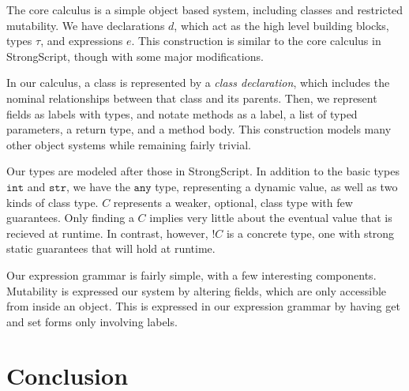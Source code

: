 \documentclass{llncs}
\newcommand{\strt}{\texttt{str}}
\newcommand{\intt}{\texttt{int}}
\newcommand{\anyt}{\texttt{any}}
\begin{document}
The core calculus is a simple object based system, including classes and 
restricted mutability. We have declarations $d$, which act as the high level 
building blocks, types $\tau$, and expressions $e$. This construction is 
similar to the core calculus in StrongScript, though with some major 
modifications.

In our calculus, a class is represented by a \emph{class declaration}, which 
includes the nominal relationships between that class and its parents. Then, we 
represent fields as labels with types, and notate methods as a label, a list 
of typed parameters, a return type, and a method body. This construction models 
many other object systems while remaining fairly trivial.

Our types are modeled after those in StrongScript. In addition to the basic 
types $\intt$ and $\strt$, we have the $\anyt$ type, representing a dynamic 
value, as well as two kinds of class type. $C$ represents a weaker, optional, 
class type with few guarantees. Only finding a $C$ implies very little about 
the eventual value that is recieved at runtime. In contrast, however, $!C$ is 
a concrete type, one with strong static guarantees that will hold at runtime. 

Our expression grammar is fairly simple, with a few interesting components. 
Mutability is expressed our system by altering fields, which are only 
accessible from inside an object. This is expressed in our expression
grammar by having get and set forms only involving labels. 

\section{Conclusion}




\end{document}
